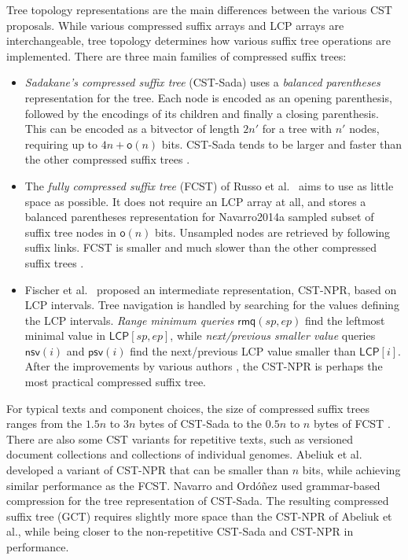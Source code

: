 \documentclass[a4paper,11pt]{llncs}
\newcommand{\CST}{\textsf{CST}}
\newcommand{\CSTsada}{\textsf{CST\nobreakdash-Sada}}
\newcommand{\GCT}{\textsf{GCT}}
\newcommand{\FCST}{\textsf{FCST}}
\newcommand{\CSTnpr}{\textsf{CST\nobreakdash-NPR}}
\newcommand{\LCP}{\textsf{LCP}}
\newcommand{\mLCP}{\ensuremath{\mathsf{LCP}}}
\newcommand{\mpsv}{\ensuremath{\mathsf{psv}}}
\newcommand{\mnsv}{\ensuremath{\mathsf{nsv}}}
\newcommand{\mrmq}{\ensuremath{\mathsf{rmq}}}
\newcommand{\oh}{\ensuremath{\mathsf{o}}}
\begin{document}
Tree topology representations are the main differences between the various \CST{} proposals. While various compressed suffix arrays and \LCP{} arrays are interchangeable, tree topology determines how various suffix tree operations are implemented. There are three main families of compressed suffix trees:
\begin{itemize}
\item \emph{Sadakane's compressed suffix tree} (\CSTsada) \cite{Sadakane2007} uses a \emph{balanced parentheses} representation for the tree. Each node is encoded as an opening parenthesis, followed by the encodings of its children and finally a closing parenthesis. This can be encoded as a bitvector of length $2n'$ for a tree with $n'$ nodes, requiring up to $4n+\oh(n)$ bits. \CSTsada{} tends to be larger and faster than the other compressed suffix trees \cite{Gog2011a,Abeliuk2013}.
\item The \emph{fully compressed suffix tree} (\FCST) of Russo et al.~\cite{Russo2011,Navarro2014a} aims to use as little space as possible. It does not require an \LCP{} array at all, and stores a balanced parentheses representation for Navarro2014a sampled subset of suffix tree nodes in $\oh(n)$ bits. Unsampled nodes are retrieved by following suffix links. \FCST{} is smaller and much slower than the other compressed suffix trees \cite{Russo2011,Abeliuk2013}.
\item Fischer et al.~\cite{Fischer2009a} proposed an intermediate representation, \CSTnpr, based on \LCP{} intervals. Tree navigation is handled by searching for the values defining the \LCP{} intervals. \emph{Range minimum queries} $\mrmq(sp,ep)$ find the leftmost minimal value in $\mLCP[sp,ep]$, while \emph{next/previous smaller value} queries $\mnsv(i)$ and $\mpsv(i)$ find the next/previous \LCP{} value smaller than $\mLCP[i]$. After the improvements by various authors \cite{Ohlebusch2009,Ohlebusch2010,Gog2011a,Abeliuk2013}, the \CSTnpr{} is perhaps the most practical compressed suffix tree.
\end{itemize}

For typical texts and component choices, the size of compressed suffix trees ranges from the $1.5n$ to $3n$ bytes of \CSTsada{} to the $0.5n$ to $n$ bytes of \FCST{} \cite{Gog2011a,Abeliuk2013}. There are also some \CST{} variants for repetitive texts, such as versioned document collections and collections of individual genomes. Abeliuk et al.~\cite{Abeliuk2013} developed a variant of \CSTnpr{} that can be smaller than $n$ bits, while achieving similar performance as the \FCST. Navarro and Ordóñez \cite{Navarro2014} used grammar-based compression for the tree representation of \CSTsada. The resulting compressed suffix tree (\GCT) requires slightly more space than the \CSTnpr{} of Abeliuk et al., while being closer to the non-repetitive \CSTsada{} and \CSTnpr{} in performance.
\end{document}
